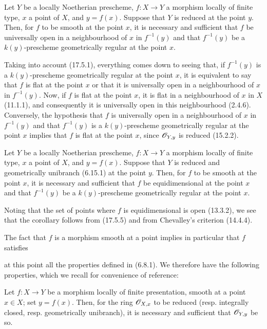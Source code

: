 \begin{proposition}[17.5.5]
\label{IV.17.5.5}
Let $Y$ be a locally Noetherian prescheme, $f:X\to Y$ a morphism locally of finite type, $x$ a point of $X$, and $y=f(x)$. Suppose that $Y$ is reduced at the point $y$. Then, for $f$ to be smooth at the point $x$, it is necessary and sufficient that $f$ be universally open in a neighbourhood of $x$ in $f^{-1}(y)$ and that $f^{-1}(y)$ be a $k(y)$-prescheme geometrically regular at the point $x$.
\end{proposition}

Taking into account (17.5.1), everything comes down to seeing that, if $f^{-1}(y)$ is a $k(y)$-prescheme geometrically regular at the point $x$, it is equivalent to say that $f$ is flat at the point $x$ or that it is universally open in a neighbourhood of $x$ in $f^{-1}(y)$. Now, if $f$ is flat at the point $x$, it is flat in a neighbourhood of $x$ in $X$ (11.1.1), and consequently it is universally open in this neighbourhood (2.4.6). Conversely, the hypothesis that $f$ is universally open in a neighbourhood of $x$ in $f^{-1}(y)$ and that $f^{-1}(y)$ is a $k(y)$-prescheme geometrically regular at the point $x$ implies that $f$ is flat at the point $x$, since $\mathscr{O}_{Y,y}$ is reduced (15.2.2).

\begin{corollary}[17.5.6]
\label{IV.17.5.6}
Let $Y$ be a locally Noetherian prescheme, $f:X\to Y$ a morphism locally of finite type, $x$ a point of $X$, and $y=f(x)$. Suppose that $Y$ is reduced and geometrically unibranch (6.15.1) at the point $y$. Then, for $f$ to be smooth at the point $x$, it is necessary and sufficient that $f$ be equidimensional at the point $x$ and that $f^{-1}(y)$ be a $k(y)$-prescheme geometrically regular at the point $x$.
\end{corollary}

Noting that the set of points where $f$ is equidimensional is open (13.3.2), we see that the corollary follows from (17.5.5) and from Chevalley's criterion (14.4.4).

The fact that $f$ is a morphism smooth at a point implies in particular that $f$ satisfies

at this point all the properties defined in (6.8.1). We therefore have the following properties, which we recall for convenience of reference:

\begin{proposition}[17.5.7]
\label{IV.17.5.7}
Let $f:X\to Y$ be a morphism locally of finite presentation, smooth at a point $x\in X$; set $y=f(x)$. Then, for the ring $\mathscr{O}_{X,x}$ to be reduced (resp. integrally closed, resp. geometrically unibranch), it is necessary and sufficient that $\mathscr{O}_{Y,y}$ be so.
\end{proposition}

